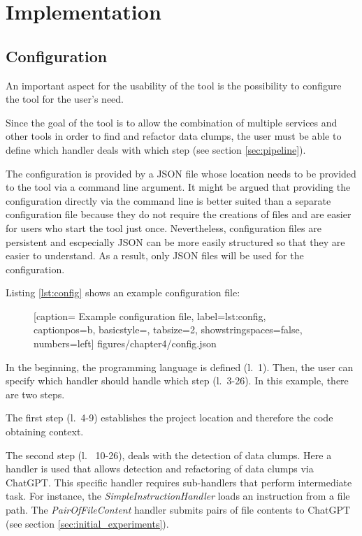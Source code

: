
\begingroup
\renewcommand{\cleardoublepage}{} %
\renewcommand{\clearpage}{}
\chapter{Implementation}\label{chapter:implementation}
\endgroup

\section{Configuration}\label{sec:config}
An important aspect for the usability of the tool is the possibility to configure the tool for the user's need. 

Since the goal of the tool is to allow the combination of multiple services and other tools in order to find and refactor data clumps, the user must be able to define which handler deals with which step (see section \ref{sec:pipeline}).

The configuration is provided by a \ac{JSON} file whose location needs to be provided to the tool via a command line argument. It might be argued that providing the configuration directly via the command line is better suited than a separate configuration file because they do not require the creations of files and are easier for users who start the tool just once. Nevertheless, configuration files are persistent and escpecially \ac{JSON} can be more easily structured so that they are easier to understand. As a result, only \ac{JSON} files will be used  for the configuration. 


Listing \ref{lst:config} shows an example configuration file:
  \begin{figure} [htbp!]
			
			[caption={ Example configuration file},
			label={lst:config},
			captionpos=b, basicstyle=\footnotesize, tabsize=2, showstringspaces=false,  numbers=left]
			{figures/chapter4/config.json}
		\end{figure}


In the beginning, the programming language is defined (l.~1). Then, the user can specify which handler should handle which step (l.~3-26). In this example, there are two steps. 

The first step (l.~4-9) establishes the project location and therefore the code obtaining context.

The second step (l.~ 10-26), deals with the detection of data clumps. Here a handler is used that allows detection and refactoring of data clumps via ChatGPT. This specific handler requires sub-handlers that perform intermediate task. For instance, the \textit{SimpleInstructionHandler} loads an instruction from a file path. The \textit{PairOfFileContent} handler submits pairs of file contents to ChatGPT (see section \ref{sec:initial_experiments}).

